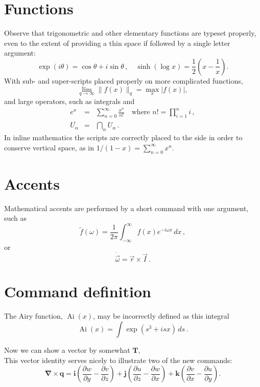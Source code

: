 \documentclass[20pt,a4paper]{article}
\begin{document}
\section{Functions}

Observe that trigonometric and other elementary functions are typeset 
properly, even to the extent of providing a thin space if followed by 
a single letter argument:
\[
\exp(i\theta)=\cos\theta +i\sin\theta\,,\quad
\sinh(\log x)=\frac{1}{2}\left( x-\frac{1}{x} \right).
\]
With sub- and super-scripts placed properly on more complicated 
functions,
\[
\lim_{q\to\infty}\|f(x)\|_q 
=\max_{x}|f(x)|,
\]
and large operators, such as integrals and
\begin{eqnarray*}
e^x & = & \sum_{n=0}^\infty \frac{x^n}{n!}
\quad\text{where }n!=\prod_{i=1}^n i\,,  \\
\overline{U_\alpha} & = & \bigcap_\alpha U_\alpha\,.
\end{eqnarray*}
In inline mathematics the scripts are correctly placed to the side in 
order to conserve vertical space, as in
\(
1/(1-x)=\sum_{n=0}^\infty x^n.
\)






\section{Accents}

Mathematical accents are performed by a short command with one 
argument, such as
\[
\tilde f(\omega)=\frac{1}{2\pi}
\int_{-\infty}^\infty f(x)e^{-i\omega x}\,dx\,,
\]
or
\[
\dot{\vec \omega}=\vec r\times\vec I\,.
\]





\section{Command definition}

\newcommand{\Ai}{\operatorname{Ai}} 
The Airy function, $\Ai(x)$, may be incorrectly defined as this 
integral
\[
\Ai(x)=\int\exp(s^3+isx)\,ds\,.
\]

\newcommand{\D}[2]{\frac{\partial #2}{\partial #1}}
\newcommand{\DD}[2]{\frac{\partial^2 #2}{\partial #1^2}}
\renewcommand{\vec}[1]{\boldsymbol{#1}}
Now we can show a vector by somewhat $\vec T$,\\
This vector identity serves nicely to illustrate two of the new 
commands:
\[
\vec\nabla\times\vec q
=\vec i\left(\D yw-\D zv\right)
+\vec j\left(\D zu-\D xw\right)
+\vec k\left(\D xv-\D yu\right).
\]
\end{document}
